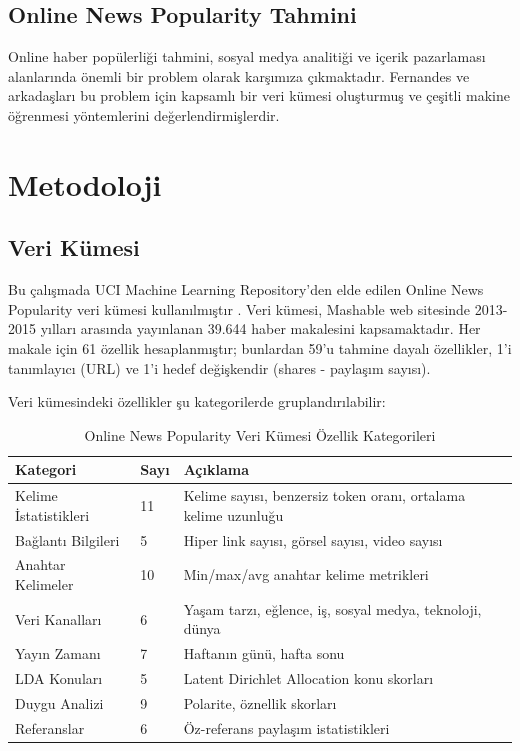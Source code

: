 \documentclass[conference]{IEEEtran}
\begin{document}
\subsection{Online News Popularity Tahmini}

Online haber popülerliği tahmini, sosyal medya analitiği ve içerik pazarlaması alanlarında önemli bir problem olarak karşımıza çıkmaktadır. Fernandes ve arkadaşları \cite{fernandes2015proactive} bu problem için kapsamlı bir veri kümesi oluşturmuş ve çeşitli makine öğrenmesi yöntemlerini değerlendirmişlerdir.

\section{Metodoloji}

\subsection{Veri Kümesi}

Bu çalışmada UCI Machine Learning Repository'den elde edilen Online News Popularity veri kümesi kullanılmıştır \cite{fernandes2015proactive}. Veri kümesi, Mashable web sitesinde 2013-2015 yılları arasında yayınlanan 39.644 haber makalesini kapsamaktadır. Her makale için 61 özellik hesaplanmıştır; bunlardan 59'u tahmine dayalı özellikler, 1'i tanımlayıcı (URL) ve 1'i hedef değişkendir (shares - paylaşım sayısı).

Veri kümesindeki özellikler şu kategorilerde gruplandırılabilir:

\begin{table}[H]
\centering
\caption{Online News Popularity Veri Kümesi Özellik Kategorileri}
\label{tab:feature_categories}
\begin{tabular}{p{2.5cm}p{1cm}p{4cm}}
\toprule
\textbf{Kategori} & \textbf{Sayı} & \textbf{Açıklama} \\
\midrule
Kelime İstatistikleri & 11 & Kelime sayısı, benzersiz token oranı, ortalama kelime uzunluğu \\
Bağlantı Bilgileri & 5 & Hiper link sayısı, görsel sayısı, video sayısı \\
Anahtar Kelimeler & 10 & Min/max/avg anahtar kelime metrikleri \\
Veri Kanalları & 6 & Yaşam tarzı, eğlence, iş, sosyal medya, teknoloji, dünya \\
Yayın Zamanı & 7 & Haftanın günü, hafta sonu \\
LDA Konuları & 5 & Latent Dirichlet Allocation konu skorları \\
Duygu Analizi & 9 & Polarite, öznellik skorları \\
Referanslar & 6 & Öz-referans paylaşım istatistikleri \\
\bottomrule
\end{tabular}
\end{table}
\end{document}
